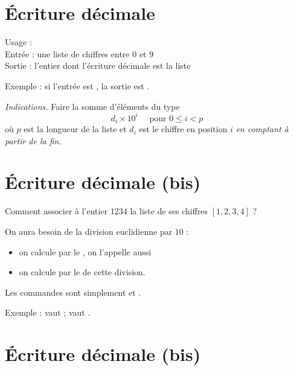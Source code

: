 \documentclass[11pt,class=report,crop=false]{standalone}
\begin{document}
\newpage

\section*{\'Ecriture décimale}

  \begin{fonction}
  Usage :  \\
  Entrée : une liste de chiffres entre $0$ et $9$ \\
  Sortie : l'entier dont l'écriture décimale est la liste
  
  \medskip
  Exemple : si l'entrée est \ci{[1,2,3,4]}, la sortie est .
  \end{fonction} 
  
  \emph{Indications.}  Faire la somme d'éléments du type
    $$d_i \times 10^{i} \quad \text{ pour } 0 \le i < p$$
    où $p$ est la longueur de la liste et $d_i$ est le chiffre en position $i$ \emph{en comptant à partir de la fin}.    

   \newpage
   
\section*{\'Ecriture décimale (bis)}   

Comment associer à l'entier $1234$ la liste de ses chiffres $[1,2,3,4]$ ?
 
 On aura besoin de la division euclidienne par $10$ :
  \begin{itemize}
    \item on calcule par  le , on l'appelle aussi 
    \item on calcule par  le  de cette division. 
  \end{itemize}
  

\bigskip

 Les commandes \Python{} sont simplement  et .
  
  Exemple :  vaut  ;  vaut .


   \newpage
   
\section*{\'Ecriture décimale (bis)}   
\end{document}
